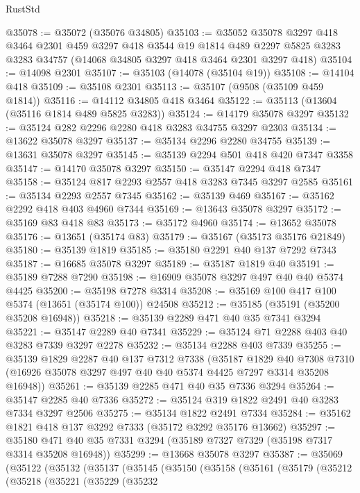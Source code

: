 \begin{lexlean}{RustStd}
\begin{coremodule}
@35078 := @35072 (@35076 @34805)
@35103 := @35052
    @35078
    @3297
    @418
    @3464
    @2301
    @459
    @3297
    @418
    @3544
    @19
    @1814
    @489
    @2297
    @5825
    @3283
    @3283
    @34757
    (@14068 @34805 @3297 @418 @3464 @2301 @3297 @418)
@35104 := @14098 @2301
@35107 := @35103 (@14078 (@35104 @19))
@35108 := @14104 @418
@35109 := @35108 @2301
@35113 := @35107 (@9508 (@35109 @459 @1814))
@35116 := @14112 @34805 @418 @3464
@35122 := @35113 (@13604 (@35116 @1814 @489 @5825 @3283))
@35124 := @14179 @35078 @3297
@35132 := @35124 @282 @2296 @2280 @418 @3283 @34755 @3297 @2303
@35134 := @13622 @35078 @3297
@35137 := @35134 @2296 @2280 @34755
@35139 := @13631 @35078 @3297
@35145 := @35139 @2294 @501 @418 @420 @7347 @3358
@35147 := @14170 @35078 @3297
@35150 := @35147 @2294 @418 @7347
@35158 := @35124 @817 @2293 @2557 @418 @3283 @7345 @3297 @2585
@35161 := @35134 @2293 @2557 @7345
@35162 := @35139 @469
@35167 := @35162 @2292 @418 @403 @4960 @7344
@35169 := @13643 @35078 @3297
@35172 := @35169 @83 @418 @83
@35173 := @35172 @4960
@35174 := @13652 @35078
@35176 := @13651 (@35174 @83)
@35179 := @35167 (@35173 @35176 @21849)
@35180 := @35139 @1819
@35185 := @35180 @2291 @40 @137 @7292 @7343
@35187 := @16685 @35078 @3297
@35189 := @35187 @1819 @40
@35191 := @35189 @7288 @7290
@35198 := @16909 @35078 @3297 @497 @40 @40 @5374 @4425
@35200 := @35198 @7278 @3314
@35208 := @35169 @100 @417 @100 @5374 (@13651 (@35174 @100)) @24508
@35212 := @35185 (@35191 (@35200 @35208 @16948))
@35218 := @35139 @2289 @471 @40 @35 @7341 @3294
@35221 := @35147 @2289 @40 @7341
@35229 := @35124 @71 @2288 @403 @40 @3283 @7339 @3297 @2278
@35232 := @35134 @2288 @403 @7339
@35255 := @35139
    @1829
    @2287
    @40
    @137
    @7312
    @7338
    (@35187
      @1829
      @40
      @7308
      @7310
      (@16926 @35078 @3297 @497 @40 @40 @5374 @4425 @7297 @3314 @35208 @16948))
@35261 := @35139 @2285 @471 @40 @35 @7336 @3294
@35264 := @35147 @2285 @40 @7336
@35272 := @35124 @319 @1822 @2491 @40 @3283 @7334 @3297 @2506
@35275 := @35134 @1822 @2491 @7334
@35284 := @35162 @1821 @418 @137 @3292 @7333 (@35172 @3292 @35176 @13662)
@35297 := @35180 @471 @40 @35 @7331 @3294 (@35189 @7327 @7329 (@35198 @7317 @3314 @35208 @16948))
@35299 := @13668 @35078 @3297
@35387 := @35069
    (@35122
      (@35132
        (@35137
          (@35145
            (@35150
              (@35158
                (@35161
                  (@35179
                    (@35212
                      (@35218
                        (@35221
                          (@35229
                            (@35232

\end{coremodule}
\end{lexlean}
